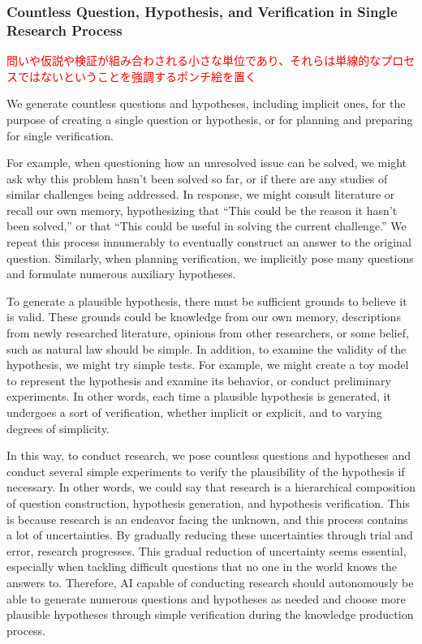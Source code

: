 \subsubsection{Countless Question, Hypothesis, and Verification in Single Research Process}


\textcolor{red}{問いや仮説や検証が組み合わされる小さな単位であり、それらは単線的なプロセスではないということを強調するポンチ絵を置く}

We generate countless questions and hypotheses, including implicit ones, for the purpose of creating a single question or hypothesis, or for planning and preparing for single verification.

For example, when questioning how an unresolved issue can be solved, we might ask why this problem hasn't been solved so far, or if there are any studies of similar challenges being addressed. In response, we might consult literature or recall our own memory, hypothesizing that ``This could be the reason it hasn't been solved,'' or that ``This could be useful in solving the current challenge.'' We repeat this process innumerably to eventually construct an answer to the original question. Similarly, when planning verification, we implicitly pose many questions and formulate numerous auxiliary hypotheses.

To generate a plausible hypothesis, there must be sufficient grounds to believe it is valid. These grounds could be knowledge from our own memory, descriptions from newly researched literature, opinions from other researchers, or some belief, such as natural law should be simple. In addition, to examine the validity of the hypothesis, we might try simple tests. For example, we might create a toy model to represent the hypothesis and examine its behavior, or conduct preliminary experiments. In other words, each time a plausible hypothesis is generated, it undergoes a sort of verification, whether implicit or explicit, and to varying degrees of simplicity.

In this way, to conduct research, we pose countless questions and hypotheses and conduct several simple  experiments to verify the plausibility of the hypothesis if necessary. In other words, we could say that research is a hierarchical composition of question construction, hypothesis generation, and hypothesis verification. This is because research is an endeavor facing the unknown, and this process contains a lot of uncertainties. By gradually reducing these uncertainties through trial and error, research progresses. This gradual reduction of uncertainty seems essential, especially when tackling difficult questions that no one in the world knows the answers to. Therefore, AI capable of conducting research should autonomously be able to generate numerous questions and hypotheses as needed and choose more plausible hypotheses through simple verification during the knowledge production process.

